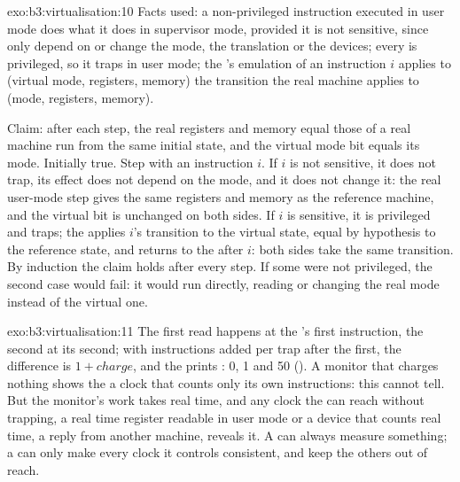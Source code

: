 \begin{solution}{exo:b3:virtualisation:10}
Facts used: a non-privileged instruction executed in user mode does what it does in supervisor mode, provided it is not sensitive, since only  depend on or change the mode, the translation or the devices; every  is privileged, so it traps in user mode; the 's emulation of an instruction $i$ applies to (virtual mode, registers, memory) the transition the real machine applies to (mode, registers, memory).

Claim: after each  step, the real registers and memory equal those of a real machine run from the same initial state, and the virtual mode bit equals its mode. Initially true. Step with an instruction $i$. If $i$ is not sensitive, it does not trap, its effect does not depend on the mode, and it does not change it: the real user-mode step gives the same registers and memory as the reference machine, and the virtual bit is unchanged on both sides. If $i$ is sensitive, it is privileged and traps; the  applies $i$'s transition to the virtual state, equal by hypothesis to the reference state, and returns to the  after $i$: both sides take the same transition. By induction the claim holds after every step. If some  were not privileged, the second case would fail: it would run directly, reading or changing the real mode instead of the virtual one.
\end{solution}

\begin{solution}{exo:b3:virtualisation:11}
The first read happens at the 's first instruction, the second at its second; with  instructions added per trap after the first, the difference is $1 + \mathit{charge}$, and the  prints : 0, 1 and 50 (). A monitor that charges nothing shows the  a clock that counts only its own instructions: this  cannot tell. But the monitor's work takes real time, and any clock the  can reach without trapping, a real time register readable in user mode or a device that counts real time, a reply from another machine, reveals it. A  can always measure something; a  can only make every clock it controls consistent, and keep the others out of reach.
\end{solution}

